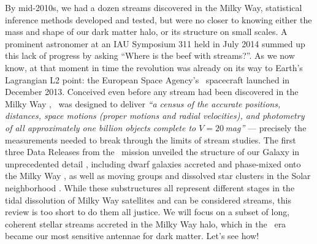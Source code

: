 \documentclass[final,5p,times,twocolumn,authoryear]{elsarticle}
\begin{document}
By mid-2010s, we had a dozen streams discovered in the Milky Way, statistical inference methods developed and tested, but were no closer to knowing either the mass and shape of our dark matter halo, or its structure on small scales.
A prominent astronomer at an IAU Symposium 311 held in July 2014 summed up this lack of progress by asking ``Where is the beef with streams?''.
As we now know, at that moment in time the revolution was already on its way to Earth's Lagrangian L2 point: the European Space Agency's \gaia\ spacecraft launched in December 2013.
Conceived even before any stream had been discovered in the Milky Way \citep{lindegren:1993, battrick:1994, lindegren:1996}, \gaia\ was designed to deliver \emph{``a census of the accurate positions, distances, space motions (proper motions and radial velocities), and photometry of all approximately one billion objects complete to $V=20$\,mag''} \citep{perryman:2001} --- precisely the measurements needed to break through the limits of stream studies.
The first three Data Releases from the \gaia\ mission unveiled the structure of our Galaxy in unprecedented detail \citep{babusiaux:2018, helmi:2018, katz:2018, antoja:2021, smart:2021, drimmel:2023, schultheis:2023}, including dwarf galaxies accreted and phase-mixed onto the Milky Way \citep{belokurov:2018, helmi:2018b, myeong:2019, naidu:2020}, as well as moving groups and dissolved star clusters in the Solar neighborhood \citep{antoja:2018, kawata:2018, ramos:2018, meingast:2019, roser:2019}.
While these substructures all represent different stages in the tidal dissolution of Milky Way satellites and can be considered streams, this review is too short to do them all justice.
We will focus on a subset of long, coherent stellar streams accreted in the Milky Way halo, which in the \gaia\ era became our most sensitive antennae for dark matter.
Let's see how!
\end{document}
